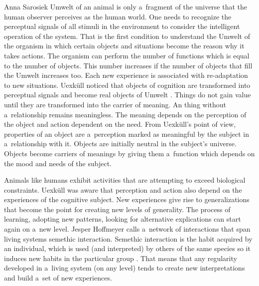 \begin{artengenv}{Anna Sarosiek}
Umwelt of an animal is only a~fragment of the universe that the human observer perceives as the human world. One needs to recognize the perceptual signals of all stimuli in the environment to consider the intelligent operation of the system. That is the first condition to understand the Umwelt of the organism in which certain objects and situations become the reason why it takes actions. The organism can perform the number of functions which is equal to the number of objects. This number increases if the number of objects that fill the Umwelt increases too. Each new experience is associated with re-adaptation to new situations. Uexküll noticed that objects of cognition are transformed into perceptual signals and become real objects of Umwelt
\parencite[][]{uexkull_streifzuge_1934}. %
 Things do not gain value until they are transformed into the carrier of meaning. An thing without a~relationship remains meaningless. The meaning depends on the perception of the object and action dependent on the need. From Uexküll's point of view, properties of an object are a~perception marked as meaningful by the subject in a~relationship with it. Objects are initially neutral in the subject's universe. Objects become carriers of meanings by giving them a~function which depends on the mood and needs of the subject.

Animals like humans exhibit activities that are attempting to exceed biological constraints. Uexküll was aware that perception and action also depend on the experiences of the cognitive subject. New experiences give rise to generalizations that become the point for creating new levels of generality. The process of learning, adopting new patterns, looking for alternative explications can start again on a~new level. Jesper Hoffmeyer calls a~network of interactions that span living systems semethic interaction. Semethic interaction is the habit acquired by an individual, which is used (and interpreted) by others of the same species so it induces new habits in the particular group
\parencite[][]{hoffmeyer_unfolding_1998}. %
 That means that any regularity developed in a~living system (on any level) tends to create new interpretations and build a~set of new experiences.


\end{artengenv}
